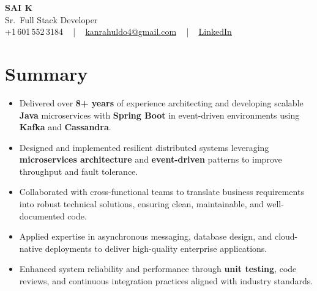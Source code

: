 \documentclass[letterpaper,11pt]{article}
\newcommand{\resumeItem}[1]{
  \item\footnotesize{
    {#1 \vspace{-2pt}}
  }
}
\newcommand{\resumeItemListStart}{\begin{itemize}[leftmargin=*]}
\newcommand{\resumeItemListEnd}{\end{itemize}\vspace{-5pt}}
\begin{document}
\begin{center}
    {\fontsize{14pt}{12pt}\selectfont \textbf{\MakeUppercase{Sai K}}}\\ \vspace{2pt}
    \fontsize{10pt}{12pt}\selectfont Sr.\ Full Stack Developer\\ \vspace{2pt}
    \fontsize{10pt}{12pt}\selectfont +1\,601\,552\,3184 ~ | ~
    \href{mailto:kanrahuldo4@gmail.com}{kanrahuldo4@gmail.com} ~ | ~
    \href{https://www.linkedin.com/in/srrrk/}{\color{blue}\underline{LinkedIn}}
    \vspace{-10pt}
\end{center}

\section{Summary}
\fontsize{9pt}{10pt}\selectfont
\resumeItemListStart
  \resumeItem{Delivered over \textbf{8+ years} of experience architecting and developing scalable \textbf{Java} microservices with \textbf{Spring Boot} in event-driven environments using \textbf{Kafka} and \textbf{Cassandra}.}
  \resumeItem{Designed and implemented resilient distributed systems leveraging \textbf{microservices architecture} and \textbf{event-driven} patterns to improve throughput and fault tolerance.}
  \resumeItem{Collaborated with cross-functional teams to translate business requirements into robust technical solutions, ensuring clean, maintainable, and well-documented code.}
  \resumeItem{Applied expertise in asynchronous messaging, database design, and cloud-native deployments to deliver high-quality enterprise applications.}
  \resumeItem{Enhanced system reliability and performance through \textbf{unit testing}, code reviews, and continuous integration practices aligned with industry standards.}
\resumeItemListEnd
\vspace{-6pt}

\end{document}
